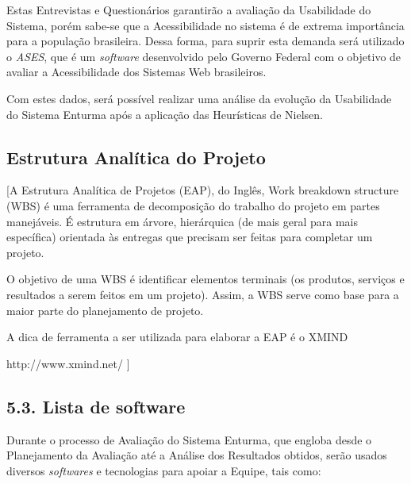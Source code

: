 	Estas Entrevistas e Questionários garantirão a avaliação da Usabilidade do Sistema, porém sabe-se que a Acessibilidade no sistema é de extrema importância para a população brasileira. Dessa forma, para suprir esta demanda será utilizado o \textit{ASES}, que é um \textit{software} desenvolvido pelo Governo Federal com o objetivo de avaliar a Acessibilidade dos Sistemas Web brasileiros.

	Com estes dados, será possível realizar uma análise da evolução da Usabilidade do Sistema Enturma após a aplicação das Heurísticas de Nielsen.

\subsection{Estrutura Analítica do Projeto}
	
	[A Estrutura Analítica de Projetos (EAP), do Inglês, Work breakdown structure (WBS) é uma ferramenta de decomposição do trabalho do projeto em partes manejáveis. É estrutura em árvore, hierárquica (de mais geral para mais específica) orientada às entregas que precisam ser feitas para completar um projeto.

	O objetivo de uma WBS é identificar elementos terminais (os produtos, serviços e resultados a serem feitos em um projeto). Assim, a WBS serve como base para a maior parte do planejamento de projeto.
	
	A dica de ferramenta a ser utilizada para elaborar a EAP é o XMIND 
	
	http://www.xmind.net/ ]

\subsection{5.3. Lista de software}
	
	Durante o processo de Avaliação do Sistema Enturma, que engloba desde o Planejamento da Avaliação até a Análise dos Resultados obtidos, serão usados diversos \textit{softwares} e tecnologias para apoiar a Equipe, tais como:

